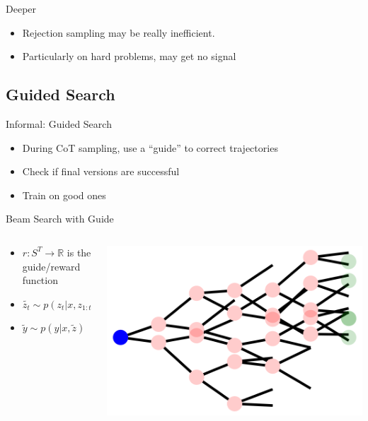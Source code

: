 \documentclass[14pt,aspectratio=169]{beamer}
\begin{document}
\begin{frame}{Deeper}
	\begin{itemize}
		\item Rejection sampling may be really inefficient.
		\item Particularly on hard problems, may get no signal
	\end{itemize}
\end{frame}

\subsection{Guided Search}

\begin{frame}{Informal: Guided Search}
	\begin{itemize}
		\item During CoT sampling, use a ``guide'' to
		      correct trajectories
		\item Check if final versions are successful
		\item Train on good ones
	\end{itemize}
\end{frame}


\begin{frame}{Beam Search with Guide}
	\begin{columns}
		\begin{column}{0.5\linewidth}
			\begin{itemize}
                \item $r: S^T \rightarrow \mathbb{R}$ is the guide/reward function
				\item $\tilde{z_{t}} \sim p(z_{t} | x, z_{1:t-1})$
				\item $\tilde{y} \sim p(y | x, \tilde{z})$
			\end{itemize}
		\end{column}
		\begin{column}{0.5\linewidth}
			\includegraphics[width=\textwidth]{images/beam.png}
		\end{column}
	\end{columns}
\end{frame}
\end{document}
